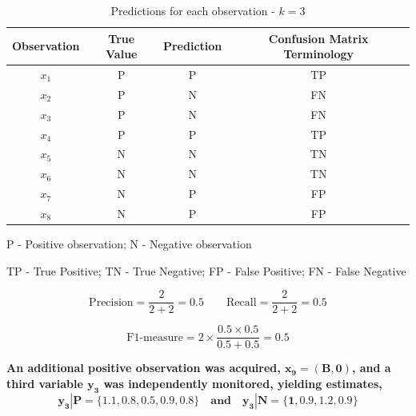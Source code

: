 \documentclass[12pt]{article}
\begin{document}
\begin{enumerate}[leftmargin=\labelsep]
    \begin{table}[H]
        \begin{center}
            \begin{threeparttable}
            \begin{tabular}{c|c|c|c}
                Observation & True Value & Prediction & Confusion Matrix Terminology\\
                \hline
                $x_1$ & P & P & TP\\
                $x_2$ & P & N & FN\\
                $x_3$ & P & N & FN\\
                $x_4$ & P & P & TP\\
                $x_5$ & N & N & TN\\
                $x_6$ & N & N & TN\\
                $x_7$ & N & P & FP\\
                $x_8$ & N & P & FP\\
            \end{tabular}
            \begin{tablenotes}
                \small
                \item[]
                \item[P - Positive observation; N - Negative observation]  
                \item[TP - True Positive; TN - True Negative; FP - False Positive; FN - False Negative] 
                \item[] 
            \end{tablenotes}
        \end{threeparttable}
            \caption{Predictions for each observation - $k=3$}
        \end{center}
    \end{table}
    
    \begin{equation*}
        \text{Precision} = \frac{2}{2 + 2} =  0.5 \quad \quad
        \text{Recall} = \frac{2}{2 + 2} = 0.5
    \end{equation*}

    \begin{equation*}
        \text{F1-measure} = 2 \times \frac{0.5 \times 0.5}{0.5 + 0.5} = 0.5
    \end{equation*}


    \vspace{15pt}
    \textbf{An additional positive observation was acquired, $\boldsymbol{x_9 = (B,0)}$, and a third variable $\boldsymbol{y_3}$
    was independently monitored, yielding estimates,}
    \[
    \boldsymbol{y_3|P = \{1.1, 0.8, 0.5, 0.9, 0.8\} \quad and \quad y_3|N = \{1, 0.9, 1.2, 0.9\}}
    \]


\end{enumerate}
\end{document}

